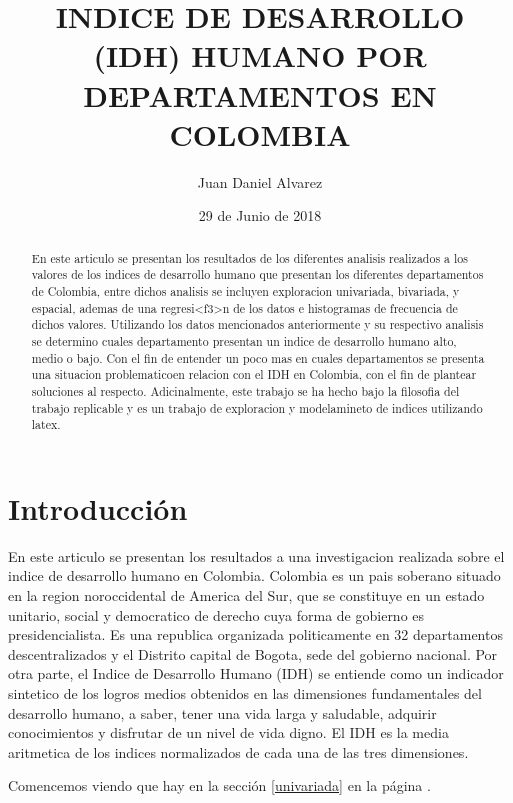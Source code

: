 \documentclass{article}
\title{INDICE DE DESARROLLO (IDH) HUMANO POR DEPARTAMENTOS EN COLOMBIA}
\author[1]{\normalsize Juan Daniel Alvarez}
\affil[1]{\small  Departamento de Ingenieria Industrial,Universidad de los Andes\\
\texttt{{jd.alvarez17}@uniandes.edu.co}}
\date{29 de Junio de 2018}
\begin{document}



\maketitle


\begin{abstract}
En este articulo se presentan los resultados de los diferentes analisis realizados a los valores de los indices de desarrollo humano que presentan los diferentes departamentos de Colombia, entre dichos analisis se incluyen exploracion univariada, bivariada, y espacial, ademas de una regresi<f3>n de los datos e histogramas de frecuencia de dichos valores. Utilizando los datos mencionados anteriormente y su respectivo analisis se determino cuales departamento presentan un indice de desarrollo humano alto, medio o bajo. Con el fin de entender un poco mas en cuales departamentos se presenta una situacion problematicoen relacion con el IDH en Colombia, con el fin de plantear soluciones al respecto. Adicinalmente, este trabajo se ha hecho bajo la filosofia del trabajo replicable y es un trabajo de exploracion y modelamineto de indices utilizando latex.

\end{abstract}

\section*{Introducción}

En este articulo se presentan los resultados a una investigacion realizada sobre el indice de desarrollo humano en Colombia. Colombia es un pais soberano situado en la region noroccidental de America del Sur, que se constituye en un estado unitario, social y democratico de derecho cuya forma de gobierno es presidencialista. Es una republica organizada politicamente en 32 departamentos descentralizados y el Distrito capital de Bogota, sede del gobierno nacional. Por otra parte, el Indice de Desarrollo Humano (IDH) se entiende como un indicador sintetico de los logros medios obtenidos en las dimensiones fundamentales del desarrollo humano, a saber, tener una vida larga y saludable, adquirir conocimientos y disfrutar de un nivel de vida digno. El IDH es la media aritmetica de los indices normalizados de cada una de las tres dimensiones.


Comencemos viendo que hay en la sección \ref{univariada} en la página \pageref{univariada}.

\clearpage
\end{document}
